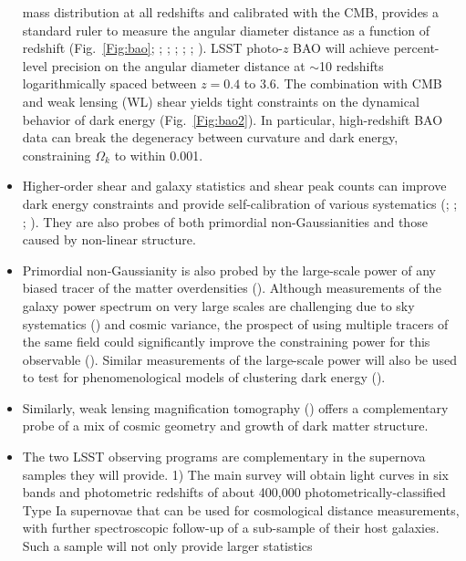 \begin{itemize}
mass distribution at all redshifts and calibrated with the CMB, provides a standard ruler to measure the angular diameter
distance as a function of redshift (Fig.~\ref{Fig:bao}; \cite{Eisenstein1998};
\cite{Cooray2001}; \cite{Blake2003}; \cite{Hu2003}; \cite{Linder2003}; \cite{Seo2003}).
LSST photo-$z$ BAO will achieve percent-level precision on the angular
diameter distance at $\sim$10 redshifts logarithmically spaced between $z = 0.4$ to 3.6. The combination with CMB
and weak lensing (WL) shear yields tight constraints on the
dynamical behavior of dark energy (Fig.~\ref{Fig:bao2}). In particular, high-redshift BAO data can break
the degeneracy between curvature and dark energy, constraining $\Omega_k$ to within
0.001.
\item Higher-order shear and galaxy statistics and shear peak counts can improve dark energy
constraints and provide self-calibration of various systematics (\cite{Takada2004};
\cite{Dolney2006}; \cite{Huterer2006}; \cite{Petri2016}). They are also probes of both
primordial non-Gaussianities and those caused by non-linear structure.
\item Primordial non-Gaussianity is also probed by the large-scale power of any biased tracer of the matter
overdensities (\cite{Dalal2008}). Although measurements of the galaxy power spectrum on very large scales
are challenging due to sky systematics (\cite{Leistedt2014}) and cosmic variance, the prospect of using
multiple tracers of the same field could significantly improve the constraining power for this observable
(\cite{Seljak2009}). Similar measurements of the large-scale power will also be used to test for phenomenological
models of clustering dark energy (\cite{Takada2006}).
\item Similarly, weak lensing magnification tomography (\cite{Morrison2012}) offers a
complementary probe of a mix of cosmic geometry and growth of dark matter structure.
\item The two LSST observing programs are complementary in the supernova samples they will provide. 1) The main survey will
obtain light curves in six bands and photometric redshifts of about 400,000 photometrically-classified Type
Ia supernovae that can be used for cosmological distance measurements, with further spectroscopic
follow-up of a sub-sample of their host galaxies.
Such a sample will not only provide larger statistics

\end{itemize}
